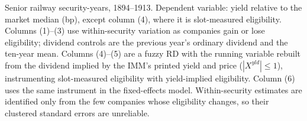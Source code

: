 Senior railway security-years, 1894--1913. Dependent variable: yield relative to the market median (bp), except column (4), where it is slot-measured eligibility. Columns (1)--(3) use within-security variation as companies gain or lose eligibility; dividend controls are the previous year's ordinary dividend and the ten-year mean. Columns (4)--(5) are a fuzzy RD with the running variable rebuilt from the dividend implied by the IMM's printed yield and price ($|X^{yld}| \le 1$), instrumenting slot-measured eligibility with yield-implied eligibility. Column (6) uses the same instrument in the fixed-effects model. Within-security estimates are identified only from the few companies whose eligibility changes, so their clustered standard errors are unreliable.
